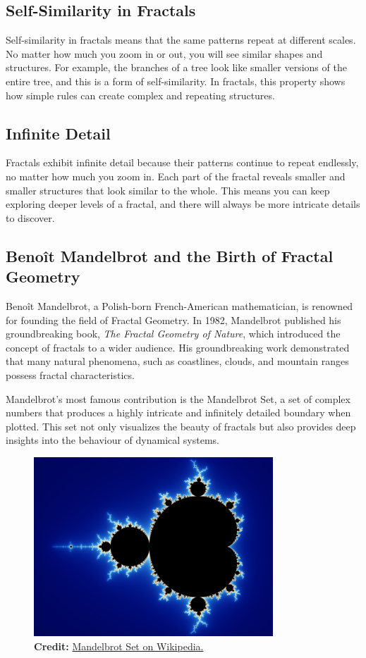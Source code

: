 \documentclass[12pt]{article}
\begin{document}
\subsection{Self-Similarity in Fractals}
Self-similarity in fractals means that the same patterns repeat at different scales. No matter how much you zoom in or out, you will see similar shapes and structures. For example, the branches of a tree look like smaller versions of the entire tree, and this is a form of self-similarity. In fractals, this property shows how simple rules can create complex and repeating structures.

\subsection{Infinite Detail}
Fractals exhibit infinite detail because their patterns continue to repeat endlessly, no matter how much you zoom in. Each part of the fractal reveals smaller and smaller structures that look similar to the whole. This means you can keep exploring deeper levels of a fractal, and there will always be more intricate details to discover. 

\subsection{Benoît Mandelbrot and the Birth of Fractal Geometry}
Benoît Mandelbrot, a Polish-born French-American mathematician, is renowned for founding the field of Fractal Geometry. In 1982, Mandelbrot published his groundbreaking book, \emph{The Fractal Geometry of Nature}, which introduced the concept of fractals to a wider audience. His groundbreaking work demonstrated that many natural phenomena, such as coastlines, clouds, and mountain ranges possess fractal characteristics. 

Mandelbrot's most famous contribution is the Mandelbrot Set, a set of complex numbers that produces a highly intricate and infinitely detailed boundary when plotted. This set not only visualizes the beauty of fractals but also provides deep insights into the behaviour of dynamical systems.

\begin{figure}[H]
\centering
\includegraphics[width=0.8\textwidth]{assets/mandelbrot-set.jpg}
\caption{\textbf{Credit:} \href{https://en.wikipedia.org/wiki/Mandelbrot_set\#/media/File:Mandel_zoom_00_mandelbrot_set.jpg}{Mandelbrot Set on Wikipedia.}}
\label{fig:mandelbrot}
\end{figure}
\end{document}
